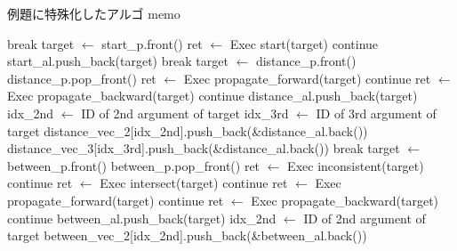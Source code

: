 \begin{algorithm}
    \scriptsize
\caption{例題に特殊化したアルゴ memo}
\begin{algorithmic}[1]
                \State break
            \EndIf
            \State target $\gets$ start\_p.front()
            \State ret $\gets$ Exec start(target)
                \State continue
            \EndIf
            \State start\_al.push\_back(target) 
        \EndWhile
                \State break
            \EndIf
            \State target $\gets$ distance\_p.front()
            \State distance\_p.pop\_front()
            \State ret $\gets$ Exec propagate\_forward(target)
                \State continue 
            \EndIf
            \State ret $\gets$ Exec propagate\_backward(target)
                \State continue 
            \EndIf
            \State distance\_al.push\_back(target)
            \State idx\_2nd $\gets$ ID of 2nd argument of target
            \State idx\_3rd $\gets$ ID of 3rd argument of target   
            \State distance\_vec\_2[idx\_2nd].push\_back(\&distance\_al.back())
            \State distance\_vec\_3[idx\_3rd].push\_back(\&distance\_al.back())
        \EndWhile
                \State break
            \EndIf
            \State target $\gets$ between\_p.front()
            \State between\_p.pop\_front()
            \State ret $\gets$ Exec inconsistent(target)
                \State continue 
            \EndIf
            \State ret $\gets$ Exec intersect(target)
                \State continue 
            \EndIf
            \State ret $\gets$ Exec propagate\_forward(target)
                \State continue 
            \EndIf
            \State ret $\gets$ Exec propagate\_backward(target)
                \State continue 
            \EndIf
            \State between\_al.push\_back(target)
            \State idx\_2nd $\gets$ ID of 2nd argument of target 
            \State between\_vec\_2[idx\_2nd].push\_back(\&between\_al.back())
        \EndWhile
    \EndProcedure
\end{algorithmic}
\end{algorithm}

